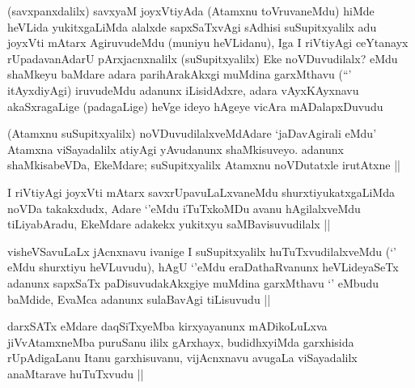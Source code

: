 
\begin{artha}
(savxpanxdalilx) savxyaM joyxVtiyAda (Atamxnu toVruvaneMdu) hiMde heVLida yukitxgaLiMda alalxde sapxSaTxvAgi sAdhisi suSupitxyalilx adu joyxVti mAtarx AgiruvudeMdu (muniyu heVLidanu), Iga I riVtiyAgi ceYtanayx rUpadavanAdarU pArxjacnxnalilx (suSupitxyalilx) Eke noVDuvudilalx? eMdu shaMkeyu baMdare adara parihArakAkxgi muMdina garxMthavu (``\stext' itAyxdiyAgi) iruvudeMdu adanunx iLisidAdxre, adara vAyxKAyxnavu akaSxragaLige (padagaLige) heVge ideyo hAgeye vicAra mADalapxDuvudu
\end{artha}

\begin{artha}
(Atamxnu suSupitxyalilx) noVDuvudilalxveMdAdare `jaDavAgirali eMdu' Atamxna viSayadalilx atiyAgi yAvudanunx shaMkisuveyo. adanunx shaMkisabeVDa, EkeMdare; suSupitxyalilx Atamxnu noVDutatxle irutAtxne ||
\end{artha}


\begin{artha}
I riVtiyAgi joyxVti mAtarx savxrUpavuLaLxvaneMdu shurxtiyukatxgaLiMda noVDa takakxdudx, Adare `\stext'eMdu iTuTxkoMDu avanu hAgilalxveMdu tiLiyabAradu, EkeMdare adakekx yukitxyu saMBavisuvudilalx ||
\end{artha}



\begin{artha}
visheVSavuLaLx jAcnxnavu ivanige I suSupitxyalilx huTuTxvudilalxveMdu (`\stext' eMdu shurxtiyu heVLuvudu), hAgU `\stext'eMdu eraDathaRvanunx heVLideyaSeTx adanunx sapxSaTx paDisuvudakAkxgiye muMdina garxMthavu `\stext' eMbudu baMdide, EvaMca adanunx sulaBavAgi tiLisuvudu ||
\end{artha}


\begin{artha}
darxSATx eMdare daqSiTxyeMba kirxyayanunx mADikoLuLxva jiVvAtamxneMba puruSanu ililx gArxhayx, budidhxyiMda garxhisida rUpAdigaLanu Itanu garxhisuvanu, vijAcnxnavu avugaLa viSayadalilx anaMtarave huTuTxvudu ||
\end{artha}

